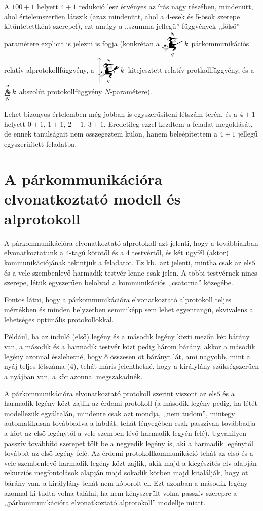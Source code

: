 \documentclass{article}
\newcommand{\mainfuncomm}[3]{\mathwitch_{#2}^{#1}#3}
\newcommand{\mainfunext}[3]{\left\uparrow\!\!\!\mathwitch*_{#2}^{#1}#3\right.}
\begin{document}
	A $100 + 1$ helyett $4 + 1$ redukció lesz érvényes az írás nagy részében, mindenütt, ahol értelemszerűen látszik (azaz mindenütt, ahol a 4-esek és 5-ösök szerepe kitüntetettként szerepel), ezt amúgy a ,,szumma-jellegű'' függvények ,,fölső'' paramétere explicit is jelezni is fogja (konkrétan a $\displaystyle\mainfuncomm Nqk$ párkommunikációs relatív alprotokollfüggvény, a $\displaystyle\mainfunext Nqk$ kitejesztett relatív protkollfüggvény, és a $\mathop{\bigtriangleup\mspace{-14.607mu}\divideontimes}\limits_N^qk$ abszolút protokollfüggvény $N$-paramétere).

	Lehet bizonyos értelemben még jobban is egyszerűsíteni létszám terén, és a $4+1$ helyett $0+1$,  $1+1$,  $2+1$,  $3+1$. Eredetileg ezzel kezdtem a feladat megoldását, de ennek tanulságait nem összegeztem külön, hanem beleépítettem a $4+1$ jellegű egyszerűített feladatba.


	\section{A párkommunikációra elvonatkoztató modell és alprotokoll}

	A párkommunikációra elvonatkoztató alprotokoll azt jelenti, hogy a továbbiakban elvonatkoztatunk a 4-tagú körötől és a 4 testvértől, és két ügyfél (aktor) kommunikációjának tekintjük a feladatot.
	Ez kb.~azt jelenti, mintha csak az első és a vele szembenlevő harmadik testvér lenne csak jelen. A többi testvérnek nincs szerepe, létük egyszerűen belolvad a kommunikációs ,,csatorna'' közegébe. 

	Fontos látni, hogy a párkommunikációra elvonatkoztató alprotokoll teljes mértékben és minden helyzetben semmiképp sem lehet egyenrangú, ekvivalens a lehetséges optimális protokollokkal.

	Például, ha az induló (első) legény és a második legény közti mezőn két bárány van, a második és a harmadik testvér közt pedig három bárány, akkor a második legény azonnal észlehetné, hogy ő összesen öt bárányt lát, ami nagyobb, mint a nyáj teljes létszáma (4), tehát máris jelenthetné, hogy a királylány szükségszerűen a nyájban van, a kör azonnal megszakadnék.

	A párkommunikációra elvonatkoztató protokoll szerint viszont az első és a harmadik legény közt zajlik az  érdemi protokoll (a második legény pedig, ha létét modellezük egyáltalán, mindenre csak azt mondja, ,,nem tudom'', mintegy automatikusan továbbadva a labdát, tehát lényegében csak passzívan továbbadja a kört az első legénytől a vele szemben lévő harmadik legyén felé). Ugyanilyen passzív továbbitó szerepet tölt be a negyedik legény is, aki a harmadik legénytől továbbít az első legény felé. Az érdemi protokollkommunikáció tehát az első és a vele szembenlevő harmadik legény közt zajlik, akik majd a kiegészítés-elv alapján rekurziós megfontolások alapján majd sokadik körben majd kitalálják, hogy öt bárány van, a királylány tehát nem kóborolt el. Ezt azonban a második legény azonnal ki tudta volna találni, ha nem kényszerült volna passzív szerepre a ,,párkommunikációra elvonatkoztató alprotokoll'' modellje miatt.
\end{document}

